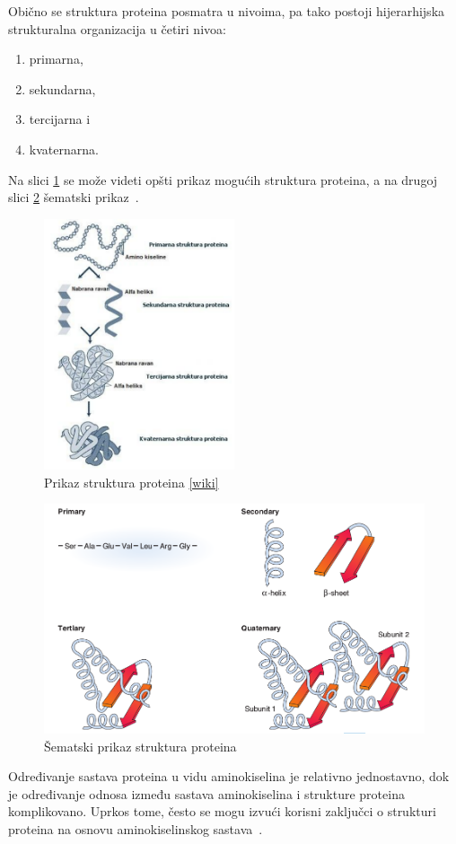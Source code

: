Obično se struktura proteina posmatra u nivoima, pa tako postoji hijerarhijska strukturalna organizacija u četiri nivoa:
\begin{enumerate}
\item primarna,
\item sekundarna,
\item tercijarna i
\item kvaternarna.
\end{enumerate}
Na slici \ref{fig:structures} se može videti opšti prikaz mogućih struktura proteina, a na drugoj slici \ref{fig:structures2} šematski prikaz~\cite{spasic}.
\begin{figure}[H]
	\centering
    \includegraphics[width=0.5\textwidth]{Figures/BO/protein_structures.png}
    \caption{Prikaz struktura proteina \ref{wiki}}
    \label{fig:structures}
\end{figure}
\begin{figure}[H]
	\centering
    \includegraphics[width=1\textwidth]{Figures/BO/structure_schema.png}
    \caption{Šematski prikaz struktura proteina~\cite{bmbg}}
    \label{fig:structures2}
\end{figure}
Određivanje sastava proteina u vidu aminokiselina je relativno jednostavno, dok je određivanje odnosa između sastava aminokiselina i strukture proteina komplikovano. Uprkos tome, često se mogu izvući korisni zaključci o strukturi proteina na osnovu aminokiselinskog sastava~\cite{Principi}.

